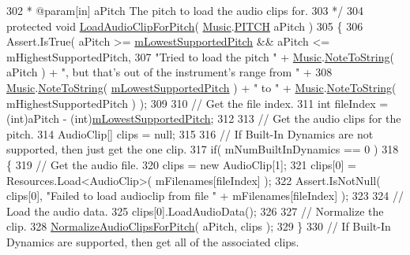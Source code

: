 \begin{DoxyCodeInclude}
302 \textcolor{comment}{     * @param[in] aPitch The pitch to load the audio clips for.}
303 \textcolor{comment}{    */}   
304     \textcolor{keyword}{protected} \textcolor{keywordtype}{void} \hyperlink{group___v_i_base_pro_func_gadbd95083895b09465fbc5b18115a1dbc}{LoadAudioClipForPitch}( \hyperlink{class_music}{Music}.\hyperlink{group___music_enums_ga508f69b199ea518f935486c990edac1d}{PITCH} aPitch )
305     \{
306         Assert.IsTrue( aPitch >= \hyperlink{group___v_i_base_pro_var_ga3cae52b1bcc0178a8a6b03c7aaf7aac8}{mLowestSupportedPitch} && aPitch <= 
      mHighestSupportedPitch,
307             \textcolor{stringliteral}{"Tried to load the pitch "} + \hyperlink{class_music}{Music}.\hyperlink{group___music_stat_func_ga85a22c905d56d4c5f4e62159bfecee8c}{NoteToString}( aPitch ) + \textcolor{stringliteral}{", but that's out
       of the instrument's range from "} +
308             \hyperlink{class_music}{Music}.\hyperlink{group___music_stat_func_ga85a22c905d56d4c5f4e62159bfecee8c}{NoteToString}( \hyperlink{group___v_i_base_pro_var_ga3cae52b1bcc0178a8a6b03c7aaf7aac8}{mLowestSupportedPitch} ) + \textcolor{stringliteral}{" to "} + 
      \hyperlink{class_music}{Music}.\hyperlink{group___music_stat_func_ga85a22c905d56d4c5f4e62159bfecee8c}{NoteToString}( mHighestSupportedPitch ) );
309 
310         \textcolor{comment}{// Get the file index.}
311         \textcolor{keywordtype}{int} fileIndex = (int)aPitch - (\textcolor{keywordtype}{int})\hyperlink{group___v_i_base_pro_var_ga3cae52b1bcc0178a8a6b03c7aaf7aac8}{mLowestSupportedPitch};
312         
313         \textcolor{comment}{// Get the audio clips for the pitch.}
314         AudioClip[] clips = null;
315 
316         \textcolor{comment}{// If Built-In Dynamics are not supported, then just get the one clip.}
317         \textcolor{keywordflow}{if}( mNumBuiltInDynamics == 0 )
318         \{
319             \textcolor{comment}{// Get the audio file.}
320             clips = \textcolor{keyword}{new} AudioClip[1];
321             clips[0] = Resources.Load<AudioClip>( mFilenames[fileIndex] );
322             Assert.IsNotNull( clips[0], \textcolor{stringliteral}{"Failed to load audioclip from file "} + mFilenames[fileIndex] );
323 
324             \textcolor{comment}{// Load the audio data.}
325             clips[0].LoadAudioData();
326 
327             \textcolor{comment}{// Normalize the clip.}
328             \hyperlink{group___v_i_base_priv_func_gaecd4f9ead08a03be878b2085055a975c}{NormalizeAudioClipsForPitch}( aPitch, clips );
329         \}
330         \textcolor{comment}{// If Built-In Dynamics are supported, then get all of the associated clips.}

\end{DoxyCodeInclude}
